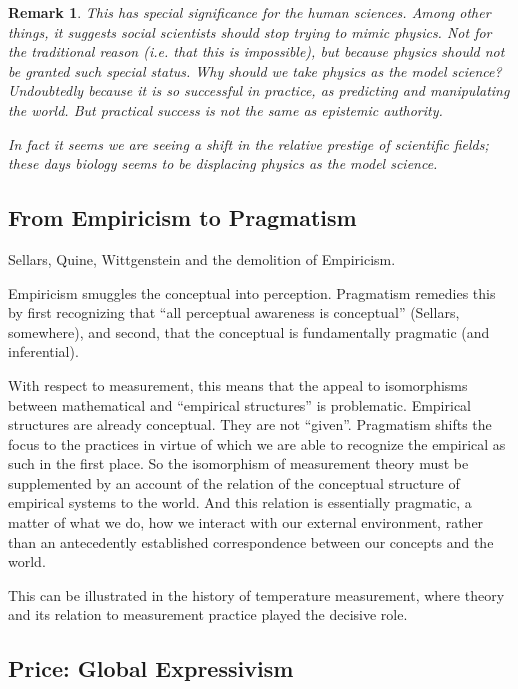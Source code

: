 \documentclass[11pt,twoside]{article}
\newtheorem{remark}{Remark}
\begin{document}
\begin{remark}
  This has special significance for the human sciences.  Among other
  things, it suggests social scientists should stop trying to mimic
  physics.  Not for the traditional reason (i.e. that this is
  impossible), but because physics should not be granted such special
  status.  Why should we take physics as the model science?
  Undoubtedly because it is so successful in practice, as predicting
  and manipulating the world.  But practical success is not the same
  as epistemic authority.

  In fact it seems we are seeing a shift in the relative prestige of
  scientific fields; these days biology seems to be displacing physics
  as the model science.
\end{remark}

\subsection{From Empiricism to Pragmatism}

Sellars, Quine, Wittgenstein and the demolition of Empiricism.

Empiricism smuggles the conceptual into perception.  Pragmatism
remedies this by first recognizing that ``all perceptual awareness is
conceptual'' (Sellars, somewhere), and second, that the conceptual is
fundamentally pragmatic (and inferential).

With respect to measurement, this means that the appeal to
isomorphisms between mathematical and ``empirical structures'' is
problematic.  Empirical structures are already conceptual.  They are
not ``given''.  Pragmatism shifts the focus to the practices in virtue
of which we are able to recognize the empirical as such in the first
place.  So the isomorphism of measurement theory must be supplemented
by an account of the relation of the conceptual structure of empirical
systems to the world.  And this relation is essentially pragmatic, a
matter of what we do, how we interact with our external environment,
rather than an antecedently established correspondence between our
concepts and the world.

This can be illustrated in the history of temperature measurement,
where theory and its relation to measurement practice played the
decisive role.

\subsection{Price: Global Expressivism}
\end{document}
